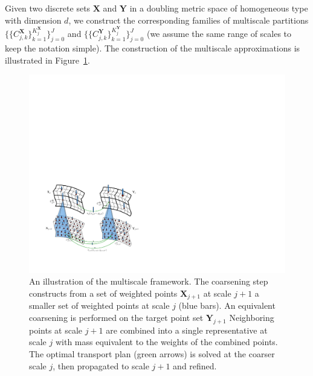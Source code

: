 \documentclass[twoside,11pt]{article}
\newcommand{\Xsp}{{\mathbf{X}}}
\newcommand{\Ysp}{{\mathbf{Y}}}
\begin{document}
Given two discrete sets ${\Xsp}$ and ${\Ysp}$ in a doubling metric space of
homogeneous type with dimension $d$, we construct the corresponding families of
multiscale partitions $\{\{C^{{\Xsp}}_{j,k}\}_{k=1}^{K^{{\Xsp}}_j}\}_{j=0}^J$
and $\{\{C^{{\Ysp}}_{j,k}\}_{k=1}^{K^{{\Ysp}}_j}\}_{j=0}^J$ (we assume the same
range of scales to keep the notation simple). The construction of the
multiscale approximations is illustrated in Figure~\ref{fig:multiscalepic}.
\begin{figure}[thb]
\centering
\includegraphics[width=0.99\linewidth]{MultiscalePic.pdf}
\caption{
\label{fig:multiscalepic}
An illustration of the multiscale framework. The coarsening step constructs
from a set of weighted points $\Xsp_{j+1}$ at scale $j+1$ a smaller set of
weighted points at scale $j$ (blue bars). An equivalent
coarsening is performed on the target point set $\Ysp_{j+1}$ Neighboring points
at scale $j+1$ are combined into a single representative at scale $j$ with mass
equivalent to the weights of the combined points. The optimal transport plan
(green arrows) is solved at the coarser scale $j$, then propagated to scale
$j+1$ and refined.  
} 
\end{figure}
\end{document}
